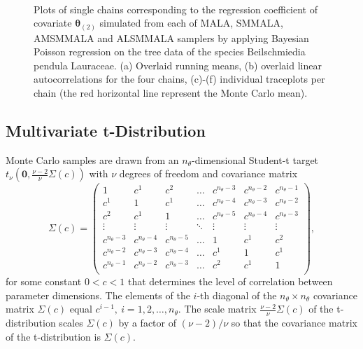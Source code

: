 \documentclass[twoside,11pt]{article}
\begin{document}
\begin{figure}
{	}
	 \\ 
	\caption{Plots of single chains corresponding to the regression coefficient of covariate $\boldsymbol{\theta}_{(2)}$ 
		simulated from each of MALA, SMMALA, AMSMMALA and ALSMMALA samplers by applying Bayesian Poisson regression on the 
		tree data of the species Beilschmiedia pendula Lauraceae. (a) Overlaid running means, (b) overlaid linear 
		autocorrelations for the four chains, (c)-(f) 
		individual traceplots per chain (the red horizontal line represent the Monte Carlo mean).}
	\label{fig:poisson}
\end{figure}

\subsection{Multivariate t-Distribution}

Monte Carlo samples are drawn from an $n_{\theta}$-dimensional Student-t target
$t_{\nu}(\mathbf{0},\frac{\nu-2}{\nu}\Sigma(c))$ with $\nu$ degrees of freedom and covariance matrix
\begin{equation}
\label{tp:eq:normal:sigma}
\Sigma(c)=\left(\begin{array}{ccccccc}
1 & c^1 & c^2 & \dots & c^{n_{\theta}-3} & c^{n_{\theta}-2} & c^{n_{\theta}-1} \\
c^1 & 1 & c^1 & \dots & c^{n_{\theta}-4} & c^{n_{\theta}-3} & c^{n_{\theta}-2} \\
c^2 & c^1 & 1 & \dots & c^{n_{\theta}-5} & c^{n_{\theta}-4} & c^{n_{\theta}-3} \\
\vdots & \vdots & \vdots & \ddots & \vdots & \vdots & \vdots \\
c^{n_{\theta}-3} & c^{n_{\theta}-4} & c^{n_{\theta}-5} & \dots & 1 & c^{1} & c^{2} \\
c^{n_{\theta}-2} & c^{n_{\theta}-3} & c^{n_{\theta}-4} & \dots & c^{1} & 1 & c^{1} \\
c^{n_{\theta}-1} & c^{n_{\theta}-2} & c^{n_{\theta}-3} & \dots & c^{2} & c^1 & 1 \\
\end{array}\right),
\end{equation}
for some constant $0<c<1$ that determines the level of correlation between parameter dimensions. The elements of the 
$i$-th diagonal of the $n_{\theta}\times n_{\theta}$ covariance matrix $\Sigma(c)$ equal $c^{i-1},~i=1,2,\dots,n_{\theta}$.
The scale matrix $\frac{\nu-2}{\nu}\Sigma(c)$ of the t-distribution scales $\Sigma(c)$ by a factor of $(\nu-2)/\nu$ so that 
the covariance matrix of the t-distribution is $\Sigma(c)$.
\end{document}
